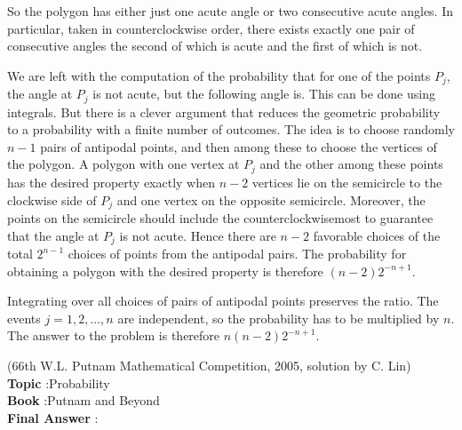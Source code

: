 \documentclass[10pt]{article}
\begin{document}
So the polygon has either just one acute angle or two consecutive acute angles. In particular, taken in counterclockwise order, there exists exactly one pair of consecutive angles the second of which is acute and the first of which is not.

We are left with the computation of the probability that for one of the points $P_{j}$, the angle at $P_{j}$ is not acute, but the following angle is. This can be done using integrals. But there is a clever argument that reduces the geometric probability to a probability with a finite number of outcomes. The idea is to choose randomly $n-1$ pairs of antipodal points, and then among these to choose the vertices of the polygon. A polygon with one vertex at $P_{j}$ and the other among these points has the desired property exactly when $n-2$ vertices lie on the semicircle to the clockwise side of $P_{j}$ and one vertex on the opposite semicircle. Moreover, the points on the semicircle should include the counterclockwisemost to guarantee that the angle at $P_{j}$ is not acute. Hence there are $n-2$ favorable choices of the total $2^{n-1}$ choices of points from the antipodal pairs. The probability for obtaining a polygon with the desired property is therefore $(n-2) 2^{-n+1}$.

Integrating over all choices of pairs of antipodal points preserves the ratio. The events $j=1,2, \ldots, n$ are independent, so the probability has to be multiplied by $n$. The answer to the problem is therefore $n(n-2) 2^{-n+1}$.

(66th W.L. Putnam Mathematical Competition, 2005, solution by C. Lin) 
\\
\textbf{Topic} :Probability\\
\textbf{Book} :Putnam and Beyond\\
\textbf{Final Answer} :\\
\end{document}
